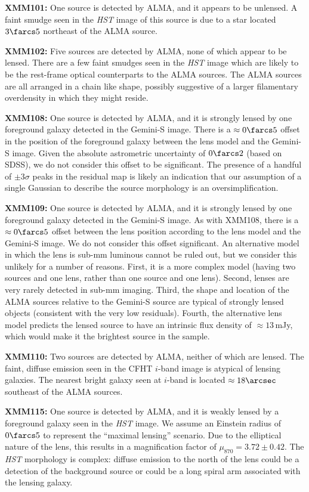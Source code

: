 \documentclass[iop]{emulateapj}
\begin{document}
{\bf XMM101:} One source is detected by ALMA, and it appears to be unlensed.  A
faint smudge seen in the {\it HST} image of this source is due to a star
located $3\farcs5$ northeast of the ALMA source.

{\bf XMM102:} Five sources are detected by ALMA, none of which appear to be
lensed.  There are a few faint smudges seen in the {\it HST} image which are
likely to be the rest-frame optical counterparts to the ALMA sources.  The ALMA
sources are all arranged in a chain like shape, possibly suggestive of a larger
filamentary overdensity in which they might reside.

{\bf XMM108:} One source is detected by ALMA, and it is strongly lensed by one
foreground galaxy detected in the Gemini-S image.  There is a $\approx
0\farcs5$ offset in the position of the foreground galaxy between the lens
model and the Gemini-S image.  Given the absolute astrometric uncertainty of
$0\farcs2$ (based on SDSS), we do not consider this offset to be significant.
The presence of a handful of $\pm3\sigma$ peaks in the residual map is likely
an indication that our assumption of a single Gaussian to describe the source
morphology is an oversimplification.

{\bf XMM109:} One source is detected by ALMA, and it is strongly lensed by one
foreground galaxy detected in the Gemini-S image.  As with XMM108, there is a
$\approx 0\farcs5$ offset between the lens position according to the lens model
and the Gemini-S image.  We do not consider this offset significant.  An
alternative model in which the lens is sub-mm luminous cannot be ruled out, but
we consider this unlikely for a number of reasons.  First, it is a more complex
model (having two sources and one lens, rather than one source and one lens).
Second, lenses are very rarely detected in sub-mm imaging.  Third, the shape
and location of the ALMA sources relative to the Gemini-S source are typical of
strongly lensed objects (consistent with the very low residuals).  Fourth, the
alternative lens model predicts the lensed source to have an intrinsic flux
density of $\approx 13 \,$mJy, which would make it the brightest source in the
sample.

{\bf XMM110:} Two sources are detected by ALMA, neither of which are lensed.
The faint, diffuse emission seen in the CFHT $i$-band image is atypical of
lensing galaxies.  The nearest bright galaxy seen at $i$-band is located
$\approx 18\arcsec$ southeast of the ALMA sources.

{\bf XMM115:} One source is detected by ALMA, and it is weakly lensed by a
foreground galaxy seen in the {\it HST} image.  We assume an Einstein radius of
$0\farcs5$ to represent the ``maximal lensing'' scenario.  Due to the
elliptical nature of the lens, this results in a magnification factor of
$\mu_{870} = 3.72 \pm 0.42$.  The {\it HST} morphology is complex: diffuse
emission to the north of the lens could be a detection of the background source
or could be a long spiral arm associated with the lensing galaxy.
\end{document}
